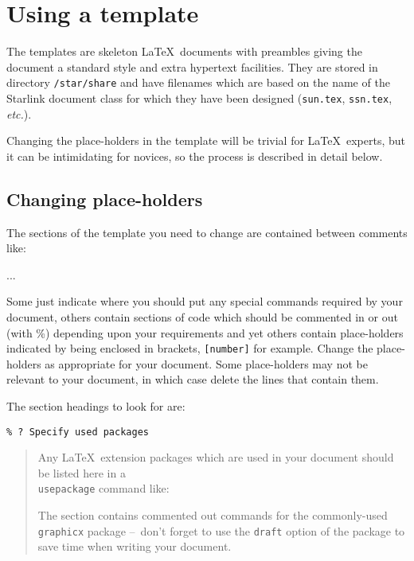 \documentclass[twoside,11pt,nolof]{starlink}
\providecommand{\dash}{--}
\begin{document}
\section{\label{using_a_template}Using a template}

The templates are skeleton \LaTeX\ documents with preambles giving
the document a standard style and extra hypertext facilities.
They are stored in directory \texttt{/star/share} and have filenames
which are based on the name of the Starlink document class for which they
have been designed (\texttt{sun.tex}, \texttt{ssn.tex}, \textit{etc.}).

Changing the place-holders in the template will be trivial for \LaTeX\
experts, but it can be intimidating for novices, so the process is
described in detail below.

\subsection{Changing place-holders}
The sections of the template you need to change are contained between comments
like:

\begin{terminalv}
...
\end{terminalv}

Some just indicate where you should put any special commands required by
your document, others contain sections of code which should be commented
in or out (with \%) depending upon your requirements and yet others contain
place-holders indicated by being enclosed in brackets,
\texttt{[number]} for example.
Change the place-holders as appropriate for your document.
Some place-holders may not be relevant to your document, in which case
delete the lines that contain them.

The section headings to look for are:


\vspace{6mm}

\verb+% ? Specify used packages+

\begin{quote}
Any \LaTeX\ extension packages which are used in your document should
be listed here in a \texttt{\\usepackage} command like:
\begin{quote}
\end{quote}
The section contains commented out commands for the commonly-used
\verb+graphicx+ package \dash\ don't forget to use the \texttt{draft} option of
the package to save time when writing your document.
\end{quote}
\end{document}
